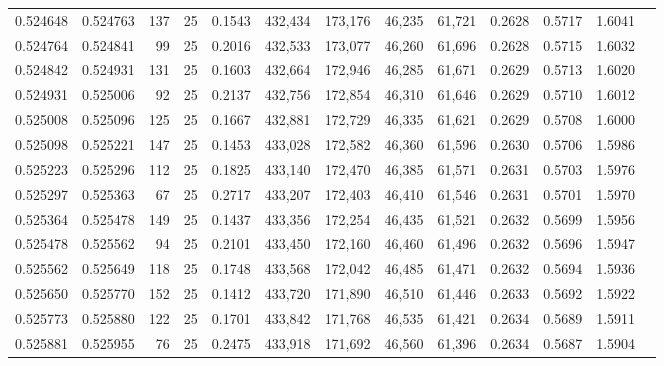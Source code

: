 \begin{tabular}{rrrrrrrrrrrrr}
0.524648 & 0.524763 &   137 &  25 &                                     0.1543 & 432,434 & 173,176 &  46,235 &  61,721 & 0.2628 & 0.5717 & 1.6041 \\
0.524764 & 0.524841 &    99 &  25 &                                     0.2016 & 432,533 & 173,077 &  46,260 &  61,696 & 0.2628 & 0.5715 & 1.6032 \\
0.524842 & 0.524931 &   131 &  25 &                                     0.1603 & 432,664 & 172,946 &  46,285 &  61,671 & 0.2629 & 0.5713 & 1.6020 \\
0.524931 & 0.525006 &    92 &  25 &                                     0.2137 & 432,756 & 172,854 &  46,310 &  61,646 & 0.2629 & 0.5710 & 1.6012 \\
0.525008 & 0.525096 &   125 &  25 &                                     0.1667 & 432,881 & 172,729 &  46,335 &  61,621 & 0.2629 & 0.5708 & 1.6000 \\
0.525098 & 0.525221 &   147 &  25 &                                     0.1453 & 433,028 & 172,582 &  46,360 &  61,596 & 0.2630 & 0.5706 & 1.5986 \\
0.525223 & 0.525296 &   112 &  25 &                                     0.1825 & 433,140 & 172,470 &  46,385 &  61,571 & 0.2631 & 0.5703 & 1.5976 \\
0.525297 & 0.525363 &    67 &  25 &                                     0.2717 & 433,207 & 172,403 &  46,410 &  61,546 & 0.2631 & 0.5701 & 1.5970 \\
0.525364 & 0.525478 &   149 &  25 &                                     0.1437 & 433,356 & 172,254 &  46,435 &  61,521 & 0.2632 & 0.5699 & 1.5956 \\
0.525478 & 0.525562 &    94 &  25 &                                     0.2101 & 433,450 & 172,160 &  46,460 &  61,496 & 0.2632 & 0.5696 & 1.5947 \\
0.525562 & 0.525649 &   118 &  25 &                                     0.1748 & 433,568 & 172,042 &  46,485 &  61,471 & 0.2632 & 0.5694 & 1.5936 \\
0.525650 & 0.525770 &   152 &  25 &                                     0.1412 & 433,720 & 171,890 &  46,510 &  61,446 & 0.2633 & 0.5692 & 1.5922 \\
0.525773 & 0.525880 &   122 &  25 &                                     0.1701 & 433,842 & 171,768 &  46,535 &  61,421 & 0.2634 & 0.5689 & 1.5911 \\
0.525881 & 0.525955 &    76 &  25 &                                     0.2475 & 433,918 & 171,692 &  46,560 &  61,396 & 0.2634 & 0.5687 & 1.5904 \\

\end{tabular}
